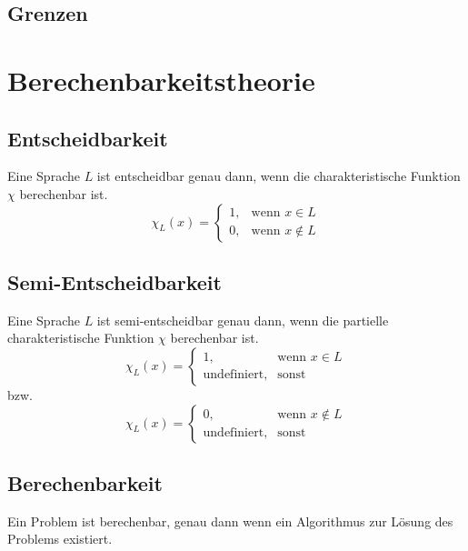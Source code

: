 \documentclass{article}
\begin{document}
\subsection{Grenzen}
\section{Berechenbarkeitstheorie}
\subsection{Entscheidbarkeit}
Eine Sprache $L$ ist entscheidbar genau dann, wenn die charakteristische Funktion $\chi$ berechenbar ist.
\begin{equation}
    \chi _L(x)=
    \begin{cases}
        1, & \text{wenn } x\in L     \\
        0, & \text{wenn } x\not\in L
    \end{cases}
\end{equation}
\subsection{Semi-Entscheidbarkeit}
Eine Sprache $L$ ist semi-entscheidbar genau dann, wenn die partielle charakteristische Funktion $\chi$ berechenbar ist.
\begin{equation}
    \chi _L(x)=
    \begin{cases}
        1,                  & \text{wenn } x\in L \\
        \text{undefiniert}, & \text{sonst}
    \end{cases}
\end{equation}
bzw.
\begin{equation}
    \chi _L(x)=
    \begin{cases}
        0,                  & \text{wenn } x\not\in L \\
        \text{undefiniert}, & \text{sonst}
    \end{cases}
\end{equation}
\subsection{Berechenbarkeit}
Ein Problem ist berechenbar, genau dann wenn ein Algorithmus zur Lösung des Problems existiert.
\end{document}
